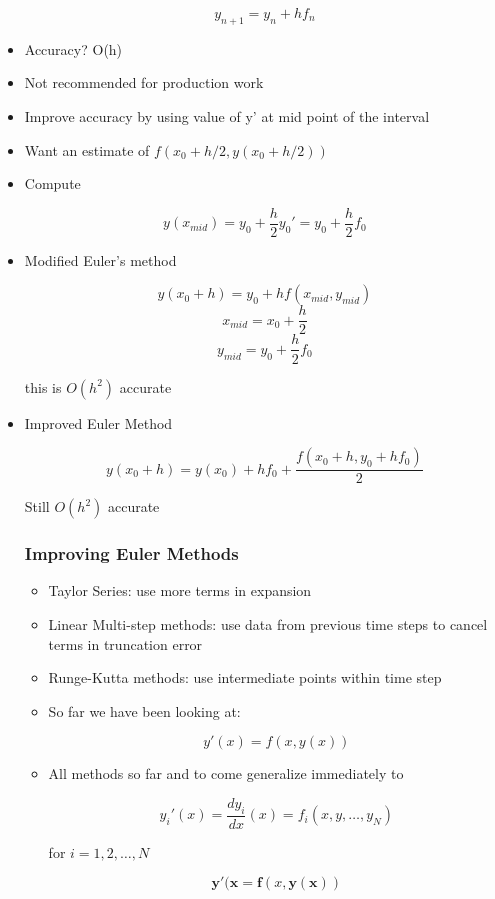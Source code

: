 \begin{itemize}
    \[ y_{n+1} = y_n + h f_n\]

    \item Accuracy? O(h)

    \item Not recommended for production work

    \item Improve accuracy by using value of y' at mid point of the interval

    \item Want an estimate of $f(x_0+h/2, y(x_0+h/2))$

    \item Compute

    \[ y(x_{mid}) = y_0 + \frac{h}{2} y_0' = y_0 + \frac{h}{2} f_0\]

    \item Modified Euler's method

    \[ y(x_0+h) = y_0+h f(x_{mid}, y_{mid})\]
    \[ x_{mid} = x_0 + \frac{h}{2}\]
    \[ y_{mid} = y_0 + \frac{h}{2} f_0\]

    this is $O(h^2)$ accurate

    \item Improved Euler Method

    \[ y(x_0+h) = y(x_0) + h f_0 + \frac{f(x_0+h, y_0+hf_0)}{2}\]

    Still $O(h^2)$ accurate

    \subsubsection{Improving Euler Methods}

    \begin{itemize}
        \item Taylor Series: use more terms in expansion
        \item Linear Multi-step methods: use data from previous time steps to cancel terms in truncation error
        \item Runge-Kutta methods: use intermediate points within time step

        \item So far we have been looking at:

        \[ y'(x) = f(x,y(x))\]

        \item All methods so far and to come generalize immediately to 

        \[ y_i'(x) = \frac{dy_i}{dx}(x) = f_i(x,y,\ldots, y_N)\]

        for $i=1,2, \ldots, N$

        \[ \mathbf{y}'(\mathbf{x} = \mathbf{f}(x, \mathbf{y}(\mathbf{x}))\]
    \end{itemize}
\end{itemize}

